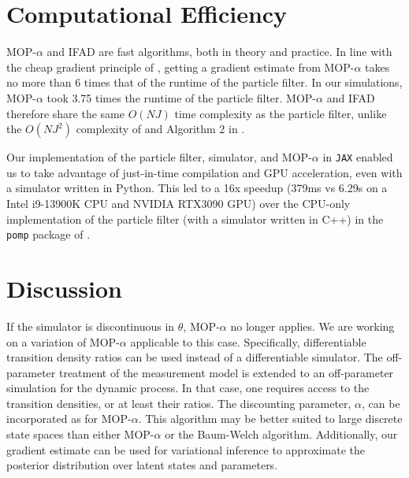 \documentclass[11pt]{article}
\begin{document}
\section{Computational Efficiency}

MOP-$\alpha$ and IFAD are fast algorithms, both in theory and practice. 
In line with the cheap gradient principle of \cite{kakade2019provably}, getting a gradient estimate from MOP-$\alpha$ takes no more than 6 times that of the runtime of the particle filter. In our simulations, MOP-$\alpha$ took 3.75 times the runtime of the particle filter. 
MOP-$\alpha$ and IFAD therefore share the same $O(NJ)$ time complexity as the particle filter, unlike the $O(NJ^2)$ complexity of \cite{corenflos21} and Algorithm 2 in \cite{poyiadjis11, scibior21}.



Our implementation of the particle filter, simulator, and MOP-$\alpha$ in \texttt{JAX} \cite{jax} enabled us to take advantage of just-in-time compilation and GPU acceleration, even with a simulator written in Python. This led to a 16x speedup (379ms vs 6.29s on a Intel i9-13900K CPU and NVIDIA RTX3090 GPU) over the CPU-only implementation of the particle filter (with a simulator written in C++) in the \texttt{pomp} package of \cite{king16}. 






\section{Discussion}

If the simulator is discontinuous in $\theta$, MOP-$\alpha$ no longer applies.
We are working on a variation of MOP-$\alpha$ applicable to this case.
Specifically, differentiable transition density ratios can be used instead of a differentiable simulator.
The off-parameter treatment of the measurement model is extended to an off-parameter simulation for the dynamic process.
In that case, one requires access to the transition densities, or at least their ratios. 
The discounting parameter, $\alpha$, can be incorporated as for MOP-$\alpha$.
This algorithm may be better suited to large discrete state spaces than either MOP-$\alpha$ or the Baum-Welch algorithm.
Additionally, our gradient estimate can be used for variational inference to approximate the posterior distribution over latent states \cite{naesseth18} and parameters. 
\end{document}

